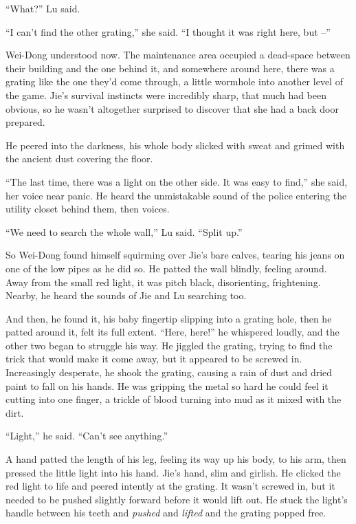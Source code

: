 ``What?'' Lu said.

``I can't find the other grating,'' she said. ``I thought it was right
here, but --''

Wei-Dong understood now. The maintenance area occupied a dead-space
between their building and the one behind it, and somewhere around
here, there was a grating like the one they'd come through, a
little wormhole into another level of the game. Jie's survival
instincts were incredibly sharp, that much had been obvious, so he
wasn't altogether surprised to discover that she had a back door
prepared.

He peered into the darkness, his whole body slicked with sweat and
grimed with the ancient dust covering the floor.

``The last time, there was a light on the other side. It was easy to
find,'' she said, her voice near panic. He heard the unmistakable
sound of the police entering the utility closet behind them, then
voices.

``We need to search the whole wall,'' Lu said. ``Split up.''

So Wei-Dong found himself squirming over Jie's bare calves, tearing
his jeans on one of the low pipes as he did so. He patted the wall
blindly, feeling around. Away from the small red light, it was
pitch black, disorienting, frightening. Nearby, he heard the sounds
of Jie and Lu searching too.

And then, he found it, his baby fingertip slipping into a grating
hole, then he patted around it, felt its full extent. ``Here, here!''
he whispered loudly, and the other two began to struggle his way.
He jiggled the grating, trying to find the trick that would make it
come away, but it appeared to be screwed in. Increasingly
desperate, he shook the grating, causing a rain of dust and dried
paint to fall on his hands. He was gripping the metal so hard he
could feel it cutting into one finger, a trickle of blood turning
into mud as it mixed with the dirt.

``Light,'' he said. ``Can't see anything.''

A hand patted the length of his leg, feeling its way up his body,
to his arm, then pressed the little light into his hand. Jie's
hand, slim and girlish. He clicked the red light to life and peered
intently at the grating. It wasn't screwed in, but it needed to be
pushed slightly forward before it would lift out. He stuck the
light's handle between his teeth and \emph{pushed} and
\emph{lifted} and the grating popped free.

